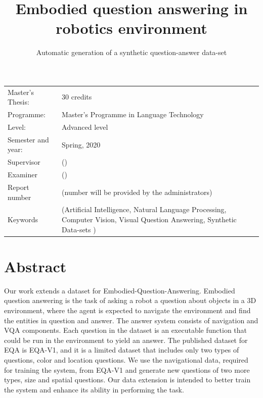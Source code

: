 \documentclass[11pt, a4paper]{article}
\title{Embodied question answering in robotics environment}
\subtitle{Automatic generation of a synthetic question-answer data-set }
\author{}
\begin{document}
\begin{titlepage}

\maketitle

\vfill

\begingroup
\renewcommand*{\arraystretch}{1.2}
\begin{tabular}{l@{\hskip 20mm}l}
\hline
Master's Thesis: & 30 credits \\
Programme: & Master’s Programme in Language Technology\\
Level: & Advanced level \\
Semester and year: & Spring, 2020\\
Supervisor & ()\\
Examiner & ()\\
Report number & (number will be provided by the administrators) \\
Keywords & (Artificial Intelligence,  Natural Language Processing, Computer Vision, Visual Question Answering, Synthetic Data-sets  ) 
\end{tabular}
\endgroup

\thispagestyle{empty}
\end{titlepage}

\newpage
\singlespacing
\section*{Abstract}
    Our work extends a dataset for Embodied-Question-Answering. Embodied question answering is the task of asking a robot a question about objects in a 3D environment, where the agent is expected to navigate the environment and find the entities in question and answer. The answer system consists of navigation and VQA components.  Each question in the dataset is an executable function that could be run in the environment to yield an answer.  The published dataset for EQA is EQA-V1, and it is a limited dataset that includes only two types of questions, color and location questions. We use the navigational data, required for training the system, from EQA-V1 and generate new questions of two more types, size and spatial questions. Our data extension is intended to better train the system and enhance its ability in performing the task. 
\end{document}

